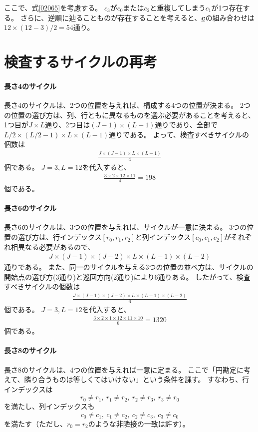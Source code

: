 \documentclass[a4paper,11pt,dvipdfmx]{jsarticle}
\theoremstyle{definition}
\begin{document}
ここで、式\eqref{02065}を考慮する。
$c_3$が$c_0$または$c_2$と重複してしまう$c_1$が1つ存在する。
さらに、逆順に辿ることものが存在することを考えると、$\underline{\bm{c}}$の組み合わせは
$12\times (12-3)/2 = 54$通り。

\section{検査するサイクルの再考}
\paragraph{長さ4のサイクル}
長さ4のサイクルは、2つの位置を与えれば、構成する4つの位置が決まる。
2つの位置の選び方は、列、行ともに異なるものを選ぶ必要があることを考えると、1つ目が$J\times L$通り、2つ目は$(J-1)\times (L-1)$通りであり、全部で$L/2\times (L/2-1)\times L\times (L-1)$通りである。
よって、検査すべきサイクルの個数は
\begin{align}
  \frac{J\times (J-1)\times L\times (L-1)}{4}\label{eq:012803}
\end{align}
個である。
$J=3, L=12$を代入すると、
\begin{align}
  \frac{3\times 2\times 12\times 11}{4} = 198
\end{align}
個である。

\paragraph{長さ6のサイクル}
長さ6のサイクルは、3つの位置を与えれば、サイクルが一意に決まる。
3つの位置の選び方は、行インデックス$[r_0,r_1,r_2]$と列インデックス$[c_0,c_1,c_2]$がそれぞれ相異なる必要があるので、
\begin{align}
  J\times (J-1)\times (J-2)\times L\times (L-1)\times (L-2)
\end{align}
通りである。
また、同一のサイクルを与える3つの位置の並べ方は、サイクルの開始点の選び方(3通り)と巡回方向(2通り)により$6$通りある。
したがって、検査すべきサイクルの個数は
\begin{align}
  \frac{J\times (J-1)\times (J-2)\times L\times (L-1)\times (L-2)}{6}\label{eq:012805}
\end{align}
個である。
$J=3, L=12$を代入すると、
\begin{align}
  \frac{3\times 2\times 1\times 12\times 11\times 10}{6} = 1320
\end{align}
個である。

\paragraph{長さ8のサイクル}
長さ8のサイクルは、4つの位置を与えれば一意に定まる。
ここで「円勘定に考えて、隣り合うものは等しくてはいけない」という条件を課す。
すなわち、行インデックスは
\[
  r_0\neq r_1,\ r_1\neq r_2,\ r_2\neq r_3,\ r_3\neq r_0
\]
を満たし、列インデックスも
\[
  c_0\neq c_1,\ c_1\neq c_2,\ c_2\neq c_3,\ c_3\neq c_0
\]
を満たす（ただし、$r_0=r_2$のような非隣接の一致は許す）。
\end{document}
